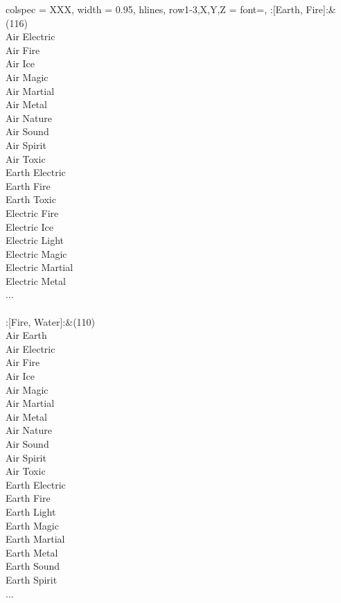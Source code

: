 \begin{longtblr}[
	caption = {2v2 Attacking Effective},
	label = {2v2-Attacking-Effective},
]{
	colspec = {XXX}, width = 0.95\linewidth,
	hlines,
	row{1-3,X,Y,Z} = {font=\bfseries},
}
	:[Earth, Fire]:&{(116)\\
	Air Electric \\
	Air Fire \\
	Air Ice \\
	Air Magic \\
	Air Martial \\
	Air Metal \\
	Air Nature \\
	Air Sound \\
	Air Spirit \\
	Air Toxic \\
	Earth Electric \\
	Earth Fire \\
	Earth Toxic \\
	Electric Fire \\
	Electric Ice \\
	Electric Light \\
	Electric Magic \\
	Electric Martial \\
	Electric Metal \\
	...\\
	}\\

	:[Fire, Water]:&{(110)\\
	Air Earth \\
	Air Electric \\
	Air Fire \\
	Air Ice \\
	Air Magic \\
	Air Martial \\
	Air Metal \\
	Air Nature \\
	Air Sound \\
	Air Spirit \\
	Air Toxic \\
	Earth Electric \\
	Earth Fire \\
	Earth Light \\
	Earth Magic \\
	Earth Martial \\
	Earth Metal \\
	Earth Sound \\
	Earth Spirit \\
	...\\
	}\\


\end{longtblr}
